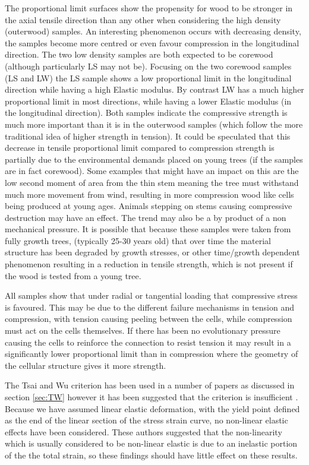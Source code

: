 \documentclass[10pt]{article}
\begin{document}
The proportional limit surfaces show the propensity for wood to be stronger in the axial tensile direction than any other when considering the high density (outerwood) samples. An interesting phenomenon occurs with decreasing density, the samples become more centred or even favour compression in the longitudinal direction. The two low density samples are both expected to be corewood (although particularly LS may not be). Focusing on the two corewood samples (LS and LW) the LS sample shows a low proportional limit in the longitudinal direction while having a high Elastic modulus. By contrast LW has a much higher proportional limit in most directions, while having a lower Elastic modulus (in the longitudinal direction). Both samples indicate the compressive strength is much more important than it is in the outerwood samples (which follow the more traditional idea of higher strength in tension). It could be speculated that this decrease in tensile proportional limit  compared to compression strength is partially due to the environmental demands placed on young trees (if the samples are in fact corewood). Some examples that might have an impact on this are the low second moment of area from the thin stem meaning the tree must withstand much more movement from wind, resulting in more compression wood like cells being produced at young ages. Animals stepping on stems causing compressive destruction may have an effect. The trend may also be a by product of a non mechanical pressure. It is possible that because these samples were taken from fully growth trees, (typically 25-30 years old) that over time the material structure has been degraded by growth stresses, or other time/growth dependent phenomenon resulting in a reduction in tensile strength, which is not present if the wood is tested from a young tree.

All samples show that under radial or tangential loading that compressive stress is favoured. This may be due to the different failure mechanisms in tension and compression, with tension causing peeling between the cells, while compression must act on the cells themselves. If there has been no evolutionary pressure causing the cells to reinforce the connection to resist tension it may result in a significantly lower proportional limit than in compression where the geometry of the cellular structure gives it more strength.

The Tsai and Wu criterion has been used in a number of papers as discussed in section \ref{sec:TW} however it has been suggested that the criterion is insufficient \citep{p_multi-surface_2003,mackenzie-helnwein_rate-independent_2005}. Because we have assumed linear elastic deformation, with the yield point defined as the end of the linear section of the stress strain curve, no non-linear elastic effects have been considered. These authors suggested that the non-linearity which is usually considered to be non-linear elastic is due to an inelastic portion of the the total strain, so these findings should have little effect on these results.
\end{document}
